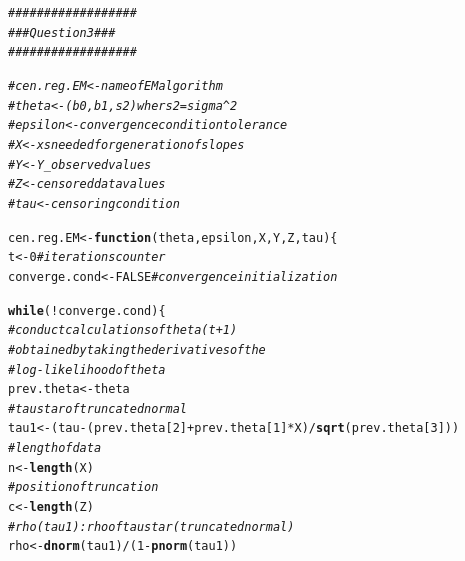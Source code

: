 \documentclass{article}\usepackage[]{graphicx}\usepackage[]{color}
\makeatletter
\newcommand{\hlnum}[1]{\textcolor[rgb]{0.686,0.059,0.569}{#1}}%
\newcommand{\hlcom}[1]{\textcolor[rgb]{0.678,0.584,0.686}{\textit{#1}}}%
\newcommand{\hlopt}[1]{\textcolor[rgb]{0,0,0}{#1}}%
\newcommand{\hlstd}[1]{\textcolor[rgb]{0.345,0.345,0.345}{#1}}%
\newcommand{\hlkwa}[1]{\textcolor[rgb]{0.161,0.373,0.58}{\textbf{#1}}}%
\newcommand{\hlkwb}[1]{\textcolor[rgb]{0.69,0.353,0.396}{#1}}%
\newcommand{\hlkwc}[1]{\textcolor[rgb]{0.333,0.667,0.333}{#1}}%
\newcommand{\hlkwd}[1]{\textcolor[rgb]{0.737,0.353,0.396}{\textbf{#1}}}%
\newenvironment{kframe}{%
 \def\at@end@of@kframe{}%
 \ifinner\ifhmode%
  \def\at@end@of@kframe{\end{minipage}}%
  \begin{minipage}{\columnwidth}%
 \fi\fi%
 \def\FrameCommand##1{\hskip\@totalleftmargin \hskip-\fboxsep
 \colorbox{shadecolor}{##1}\hskip-\fboxsep
     \hskip-\linewidth \hskip-\@totalleftmargin \hskip\columnwidth}%
 \MakeFramed {\advance\hsize-\width
   \@totalleftmargin\z@ \linewidth\hsize
   \@setminipage}}%
 {\par\unskip\endMakeFramed%
 \at@end@of@kframe}
\newenvironment{knitrout}{}{} %
\makeatother
\begin{document}
\begin{knitrout}
\color{fgcolor}\begin{kframe}
\begin{alltt}
\hlcom{##################}
\hlcom{### Question 3 ###}
\hlcom{##################}

\hlcom{#cen.reg.EM <- name of EM algorithm}
\hlcom{#theta <- (b0, b1, s2) wher s2 = sigma^2}
\hlcom{#epsilon <- convergence condition tolerance}
\hlcom{#X <- xs needed for generation of slopes}
\hlcom{#Y <- Y_observed values}
\hlcom{#Z <- censored data values}
\hlcom{#tau <- censoring condition}


\hlstd{cen.reg.EM} \hlkwb{<-} \hlkwa{function}\hlstd{(}\hlkwc{theta}\hlstd{,} \hlkwc{epsilon}\hlstd{,} \hlkwc{X}\hlstd{,} \hlkwc{Y}\hlstd{,} \hlkwc{Z}\hlstd{,} \hlkwc{tau}\hlstd{) \{}
  \hlstd{t} \hlkwb{<-} \hlnum{0} \hlcom{#iterations counter}
  \hlstd{converge.cond} \hlkwb{<-} \hlnum{FALSE} \hlcom{#convergence initialization}

  \hlkwa{while}\hlstd{(}\hlopt{!}\hlstd{converge.cond) \{}
    \hlcom{#conduct calculations of theta(t+1)}
    \hlcom{#obtained by taking the derivatives of the}
    \hlcom{#log-likelihood of theta}
    \hlstd{prev.theta} \hlkwb{<-} \hlstd{theta}
    \hlcom{#tau star of truncated normal}
    \hlstd{tau1} \hlkwb{<-} \hlstd{(tau} \hlopt{-} \hlstd{(prev.theta[}\hlnum{2}\hlstd{]}\hlopt{+}\hlstd{prev.theta[}\hlnum{1}\hlstd{]}\hlopt{*}\hlstd{X)}\hlopt{/}\hlkwd{sqrt}\hlstd{(prev.theta[}\hlnum{3}\hlstd{]))}
    \hlcom{#length of data}
    \hlstd{n} \hlkwb{<-} \hlkwd{length}\hlstd{(X)}
    \hlcom{#position of truncation}
    \hlstd{c} \hlkwb{<-} \hlkwd{length}\hlstd{(Z)}
    \hlcom{#rho(tau1): rho of tau star (truncated normal)}
    \hlstd{rho} \hlkwb{<-} \hlkwd{dnorm}\hlstd{(tau1)} \hlopt{/} \hlstd{(}\hlnum{1} \hlopt{-} \hlkwd{pnorm}\hlstd{(tau1))}


\end{alltt}
\end{kframe}
\end{knitrout}
\end{document}
